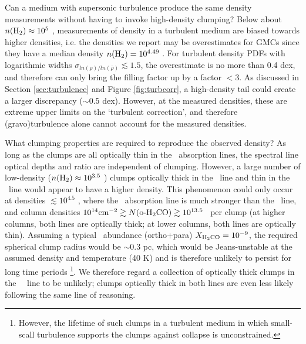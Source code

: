 Can a medium with supersonic turbulence produce the same density measurements
without having to invoke high-density clumping?  Below about
$n(\textrm{H}_{2})\approx10^5$ \percc, measurements of density in a turbulent medium are biased
towards higher densities, i.e. the densities we report may be overestimates for
GMCs since they have a median density $n(\textrm{H}_{2})=10^{4.49}$ \percc.  For turbulent
density PDFs with logarithmic widths $\sigma_{ln(\rho)/ln(\bar{\rho})} \lesssim
1.5$, the overestimate is no more than 0.4 dex, and therefore can only bring
the filling factor up by a factor $<3$.  As discussed in Section
\ref{sec:turbulence} and Figure \ref{fig:turbcorr}, a high-density tail could
create a larger discrepancy ($\sim 0.5$ dex).  However, at the measured
densities, these are extreme upper limits on the `turbulent correction', and
therefore (gravo)turbulence alone cannot account for the measured densities.

What clumping properties are required to reproduce the observed density?  As
long as the clumps are all optically thin in the \formaldehyde\ absorption
lines, the spectral line optical depths and ratio are independent of clumping.  However,
a large number of low-density ($n(\textrm{H}_{2})\approx10^{3.5}$ \percc) clumps optically
thick in the \oneone\ line and thin in the \twotwo\ line would appear to have a
higher density.  This phenomenon could only occur at densities
$\lesssim10^{4.5}$ \percc, where the \oneone\ absorption line is much stronger
than the \twotwo\ line, and column densities $10^{14} \textrm{cm}^{-2} \gtrsim
N(\textrm{o-H}_2\textrm{CO}) \gtrsim 10^{13.5} $ \persc\ per clump (at higher columns, both
lines are optically thick; at lower columns, both lines are optically thin).
Assuming a typical \formaldehyde\ abundance (ortho+para) $X_{\textrm{H}_2\textrm{CO}}=10^{-9}$, the
required spherical clump radius would be $\sim0.3 $ pc, which would be
Jeans-unstable at the assumed density and temperature (40 K) and is therefore
unlikely to persist for long time periods \footnote{However, the lifetime of
such clumps in a turbulent medium in which small-scall turbulence supports the
clumps against collapse is unconstrained.}. We therefore regard a collection
of optically thick clumps in the \formaldehyde\ \oneone\ line to be 
unlikely; clumps optically thick in both lines are even less likely following
the same line of reasoning.

